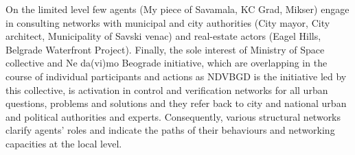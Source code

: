\documentclass[11pt]{report}
\begin{document}
On the limited level few agents (My piece of Savamala, KC Grad, Mikser) engage in consulting networks with municipal and city authorities (City mayor, City architect, Municipality of Savski venac) and real-estate actors (Eagel Hills, Belgrade Waterfront Project). Finally, the sole interest of Ministry of Space collective and Ne da(vi)mo Beograde initiative, which are overlapping in the course of individual participants and actions as NDVBGD is the initiative led by this collective, is activation in control and verification networks for all urban questions, problems and solutions and they refer back to city and national urban and political authorities and experts.
Consequently, various structural networks clarify agents’ roles and indicate the paths of their behaviours and networking capacities at the local level.
\end{document}
